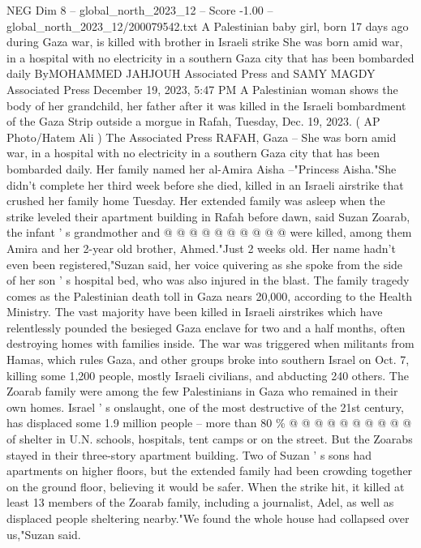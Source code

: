\begin{textsample}{NEG Dim 8 – global\_north\_2023\_12 – Score -1.00 – global\_north\_2023\_12/200079542.txt}  \label{ex:f8_neg_175}
A Palestinian baby girl, born 17 days ago during Gaza war, is killed with brother in Israeli strike She was born amid war, in a hospital with no electricity in a southern Gaza city that has been bombarded daily ByMOHAMMED JAHJOUH Associated Press and SAMY MAGDY Associated Press December 19, 2023, 5:47 PM A Palestinian woman shows the body of her grandchild, her father after it was killed in the Israeli bombardment of the Gaza Strip outside a morgue in Rafah, Tuesday, Dec. 19, 2023. ( AP Photo/Hatem Ali ) The Associated Press RAFAH, Gaza -- She was born amid war, in a hospital with no electricity in a southern Gaza city that has been bombarded daily.
Her family named her al-Amira Aisha --"Princess Aisha."She didn't complete her third week before she died, killed in an Israeli airstrike that crushed her family home Tuesday.
Her extended family was asleep when the strike leveled their apartment building in Rafah before dawn, said Suzan Zoarab, the infant ' s grandmother and @ @ @ @ @ @ @ @ @ @ were killed, among them Amira and her 2-year old brother, Ahmed."Just 2 weeks old.
Her name hadn't even been registered,"Suzan said, her voice quivering as she spoke from the side of her son ' s hospital bed, who was also injured in the blast.
The family tragedy comes as the Palestinian death toll in Gaza nears 20,000, according to the Health Ministry.
The vast majority have been killed in Israeli airstrikes which have relentlessly pounded the besieged Gaza enclave for two and a half months, often destroying homes with families inside.
The war was triggered when militants from Hamas, which rules Gaza, and other groups broke into southern Israel on Oct. 7, killing some 1,200 people, mostly Israeli civilians, and abducting 240 others.
The Zoarab family were among the few Palestinians in Gaza who remained in their own homes.
Israel ' s onslaught, one of the most destructive of the 21st century, has displaced some 1.9 million people -- more than 80 \% @ @ @ @ @ @ @ @ @ @ of shelter in U.N. schools, hospitals, tent camps or on the street.
But the Zoarabs stayed in their three-story apartment building.
Two of Suzan ' s sons had apartments on higher floors, but the extended family had been crowding together on the ground floor, believing it would be safer.
When the strike hit, it killed at least 13 members of the Zoarab family, including a journalist, Adel, as well as displaced people sheltering nearby."We found the whole house had collapsed over us,"Suzan said.

\end{textsample}
